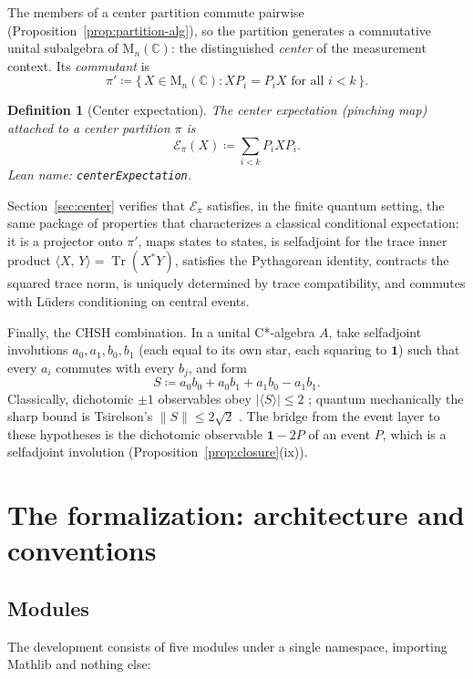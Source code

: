 \documentclass[11pt]{article}
\renewcommand{\_}{\textunderscore\allowbreak}
\newtheorem{definition}{Definition}
\theoremstyle{remark}
\newcommand{\C}{\mathbb C}
\newcommand{\Mn}{\mathrm{M}_n(\C)}
\newcommand{\Tr}{\operatorname{Tr}}
\newcommand{\norm}[1]{\lVert #1\rVert}
\newcommand{\one}{\mathbf 1}
\newcommand{\pinch}{\mathcal E}
\newcommand{\ip}[2]{\langle #1,\,#2\rangle}
\begin{document}
The members of a center partition commute pairwise (Proposition~\ref{prop:partition-alg}), so the partition generates a commutative unital subalgebra of $\Mn$: the distinguished \emph{center} of the measurement context. Its \emph{commutant} is
\[
\pi' \coloneqq \{\, X \in \Mn : X P_i = P_i X \text{ for all } i < k \,\}.
\]

\begin{definition}[Center expectation]
\label{def:pinching}
The \emph{center expectation} (pinching map) attached to a center partition $\pi$ is
\[
\pinch_\pi(X) \coloneqq \sum_{i < k} P_i X P_i .
\]
Lean name: \texttt{centerExpectation}.
\end{definition}

Section~\ref{sec:center} verifies that $\pinch_\pi$ satisfies, in the finite quantum setting, the same package of properties that characterizes a classical conditional expectation: it is a projector onto $\pi'$, maps states to states, is selfadjoint for the trace inner product $\ip{X}{Y} = \Tr(X^{*}Y)$, satisfies the Pythagorean identity, contracts the squared trace norm, is uniquely determined by trace compatibility, and commutes with L\"uders conditioning on central events.

Finally, the CHSH combination. In a unital C*-algebra $A$, take selfadjoint involutions $a_0, a_1, b_0, b_1$ (each equal to its own star, each squaring to $\one$) such that every $a_i$ commutes with every $b_j$, and form
\[
S \coloneqq a_0 b_0 + a_0 b_1 + a_1 b_0 - a_1 b_1 .
\]
Classically, dichotomic $\pm 1$ observables obey $\lvert \langle S \rangle \rvert \le 2$ \cite{bell1964,chsh1969}; quantum mechanically the sharp bound is Tsirelson's $\norm{S} \le 2\sqrt{2}$ \cite{tsirelson1980}. The bridge from the event layer to these hypotheses is the dichotomic observable $\one - 2P$ of an event $P$, which is a selfadjoint involution (Proposition~\ref{prop:closure}(ix)).

\section{The formalization: architecture and conventions}
\label{sec:arch}

\subsection{Modules}

The development consists of five modules under a single namespace, importing Mathlib and nothing else:
\end{document}
